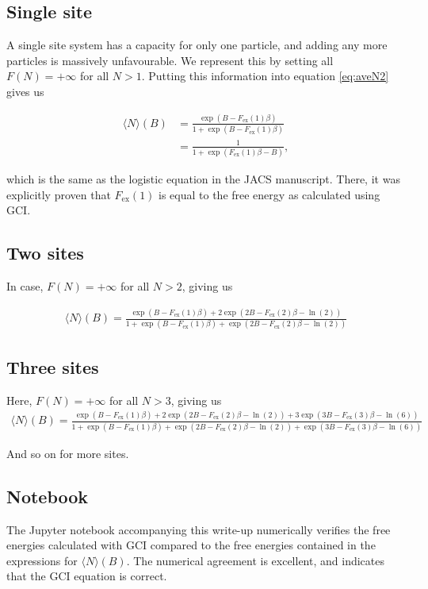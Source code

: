 \documentclass[10pt,a4paper]{article}
\begin{document}
\subsection{Single site}
A single site system has a capacity for only one particle, and adding any more particles is massively unfavourable. We represent this by setting all $F(N)=+\infty$ for all $N>1$. Putting this information into equation \ref{eq:aveN2} gives us

\begin{align*}
\langle N \rangle(B) &= \frac{\exp(B - F_\text{ex}(1)\beta)}{1 + \exp(B - F_\text{ex}(1)\beta)} \\
&= \frac{1}{1 + \exp(F_\text{ex}(1)\beta - B)},
\end{align*}

which is the same as the logistic equation in the JACS manuscript. There, it was explicitly proven that $F_\text{ex}(1)$ is equal to the free energy as calculated using GCI.

\subsection{Two sites}
In case, $F(N) = +\infty$ for all $N>2$, giving us

\begin{align*}
\langle N \rangle(B) = \frac{\exp(B - F_\text{ex}(1)\beta) + 2\exp(2B - F_\text{ex}(2)\beta - \ln(2))}{1 + \exp(B - F_\text{ex}(1)\beta) + \exp(2B - F_\text{ex}(2)\beta - \ln(2))}
\end{align*}

\subsection{Three sites}
Here, $F(N) = +\infty$ for all $N>3$, giving us
\begin{align*}
\langle N \rangle(B) = \frac{\exp(B - F_\text{ex}(1)\beta) + 2\exp(2B - F_\text{ex}(2)\beta - \ln(2)) + 3\exp(3B - F_\text{ex}(3)\beta - \ln(6))}{1 + \exp(B - F_\text{ex}(1)\beta) + \exp(2B - F_\text{ex}(2)\beta - \ln(2)) + \exp(3B - F_\text{ex}(3)\beta - \ln(6))}
\end{align*}

And so on for more sites.

\subsection{Notebook}
The Jupyter notebook accompanying this write-up  numerically verifies the free energies calculated with GCI compared to the free energies contained in the expressions for $\langle N \rangle(B)$. The numerical agreement is excellent, and indicates that the GCI equation is correct.
\end{document}
